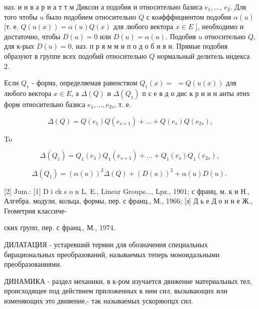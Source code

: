 \documentclass[10pt]{article}
\begin{document}
наз. и н в а р и а т т м Диксон а подобия $и$ относительно базиса $e_{1}, \ldots$, $e_{2}$. Для того чтобы $u$ было подобием относительно $Q$ с коәфффициентом подобия $\alpha(u)$ [т. е. $Q(u(x))=\alpha(u) Q(x)$ для любого вектора $x \in E$ ], необходимо и достаточно, чтобы $D(u)=0$ или $D(u)=\alpha(u)$. Подобия $u$ относительно $Q$, для к-рых $D(u)=0$, наз. п р я м м и п о д о б и я и. Прямые подобия образуют в группе всех подобий относительно $Q$ нормальный делитель индекса 2.



Если $Q_{1}$ - форма, определяемая равенством $Q_{1}(x)=$ $=Q(u(x))$ для любого вектора $x \in E$, а $\Delta(Q)$ и $\Delta\left(Q_{1}\right)$ п с е в д о дис к р и и н анты әтих форм относительно базиса $e_{1}, \ldots, e_{2 s}$, т. е.



\[

\Delta(Q)=Q\left(e_{1}\right) Q\left(e_{s+1}\right)+\ldots+Q\left(e_{s}\right) Q\left(e_{2 s}\right),

\]



To



\[

\Delta\left(Q_{1}\right)=Q_{1}\left(e_{1}\right) Q_{1}\left(e_{s+1}\right)+\ldots+Q_{1}\left(e_{s}\right) Q_{1}\left(e_{2 s}\right) \text {, }

\]



\[

\Delta\left(Q_{1}\right)=(\alpha(u))^{2} \Delta(Q)+(D(u))^{2}+\alpha(u) D(u) \text {. }

\]



[2] Jum.: [1] D i ck s o n L. E., Linear Groups..., Lpz., 1901; с франц, м. к и Н., Алгебра. модули, кольца, формы, пер. с франц., М., 1966; [з] Д ь е Д о н н е Ж., Геометрия классиче-

ских групп, пер. с франц., М., 1974.



ДИЛАТАЦИЯ - устаревший термин для обозначения специальных бирациональных преобразований, называемых теперь моноидальными преобразованиями.



ДИНАМИКА - раздел механики, в к-ром изучается движение материальных тел, происходящее под действием приложенных к ним сил, вызывающих или изменяющих это двияение,- так называемых ускоряюпџх сил.
\end{document}
